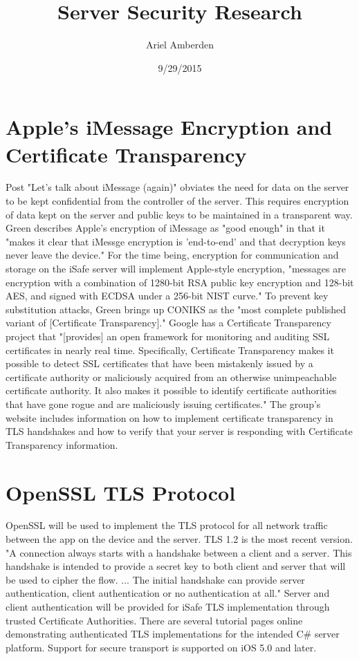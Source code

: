 \documentclass[10pt]{article}
\begin{document}
\title{Server Security Research}
\author{Ariel Amberden}
\date{9/29/2015}
\maketitle

\section*{Apple's iMessage Encryption and Certificate Transparency} 
Post "Let's talk about iMessage (again)" obviates the need for data on the server to be kept confidential from the controller of the server.  This requires encryption of data kept on the server and public keys to be maintained in a transparent way.  Green describes Apple's encryption of iMessage as "good enough" in that it "makes it clear that iMessge encryption is 'end-to-end' and that decryption keys never leave the device." \cite{iMessage}  For the time being, encryption for communication and storage on the iSafe server will implement Apple-style encryption, "messages are encryption with a combination of 1280-bit RSA public key encryption and 128-bit AES, and signed with ECDSA under a 256-bit NIST curve." \cite{iMessage}  To prevent key substitution attacks, Green brings up CONIKS as the "most complete published variant of [Certificate Transparency]." \cite{iMessage}  Google has a Certificate Transparency project that "[provides] an open framework for monitoring and auditing SSL certificates in nearly real time. Specifically, Certificate Transparency makes it possible to detect SSL certificates that have been mistakenly issued by a certificate authority or maliciously acquired from an otherwise unimpeachable certificate authority. It also makes it possible to identify certificate authorities that have gone rogue and are maliciously issuing certificates." \cite{certtrans}  The group's website includes information on how to implement certificate transparency in TLS handshakes and how to verify that your server is responding with Certificate Transparency information.

\section*{OpenSSL TLS Protocol}
OpenSSL will be used to implement the TLS protocol for all network traffic between the app on the device and the server.  TLS 1.2 is the most recent version.  "A connection always starts with a handshake between a client and a server. This handshake is intended to provide a secret key to both client and server that will be used to cipher the flow. ... The initial handshake can provide server authentication, client authentication or no authentication at all." \cite{openssl}  Server and client authentication will be provided for iSafe TLS implementation through trusted Certificate Authorities.  There are several tutorial pages online demonstrating authenticated TLS implementations for the intended C\# server platform.  Support for secure transport is supported on iOS 5.0 and later. \cite{macdevlib}
\end{document}
